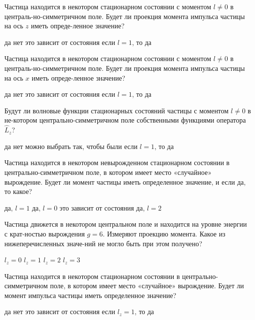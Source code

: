 \documentclass[11pt,a4paper]{exam}
\begin{document}
\begin{questions}
\question Частица находится в некотором стационарном состоянии с моментом $l \ne 0$ в централь-но-симметричном поле. Будет ли проекция момента импульса частицы на ось $z$ иметь опреде-ленное значение? 
\begin{choices}
\choice да    
\choice нет      
\choice это зависит от состояния      
\choice если $l = 1$, то да
\end{choices}

\question Частица находится в некотором стационарном состоянии с моментом $l \ne 0$ в централь-но-симметричном поле. Будет ли проекция момента импульса частицы на ось $x$ иметь опреде-ленное значение?
\begin{choices}
\choice да    
\choice нет      
\choice это зависит от состояния      
\choice если $l = 1$, то да
\end{choices}

\question Будут ли волновые функции стационарных состояний частицы с моментом $l \ne 0$ в не-котором центрально-симметричном поле собственными функциями оператора ${\hat L_z}$?
\begin{choices}
\choice да
\choice нет
\choice можно выбрать так, чтобы были
\choice если $l = 1$, то да 
\end{choices}

\question Частица находится в некотором невырожденном стационарном состоянии в центрально-симметричном поле, в котором имеет место «случайное» вырождение. Будет ли момент частицы иметь определенное значение, и если да, то какое?
\begin{choices}
\choice да, $l = 1$    
\choice да, $l = 0$    
\choice это зависит от состояния      
\choice да, $l = 2$
\end{choices}

\question Частица движется в некотором центральном поле и находится на уровне энергии с крат-ностью вырождения $g = 6$. Измеряют проекцию момента. Какое из нижеперечисленных значе-ний не могло быть при этом получено?
\begin{choices}
\choice ${l_z} = 0$    
\choice ${l_z} = 1$    
\choice ${l_z} = 2$    
\choice ${l_z} = 3$
\end{choices}

\question Частица находится в некотором стационарном состоянии в центрально-симметричном поле, в котором имеет место «случайное» вырождение. Будет ли момент импульса частицы иметь определенное значение?
\begin{choices}
\choice да    
\choice нет      
\choice это зависит от состояния      
\choice если ${l_z} = 1$, то да
\end{choices}


\end{questions}
\end{document}
